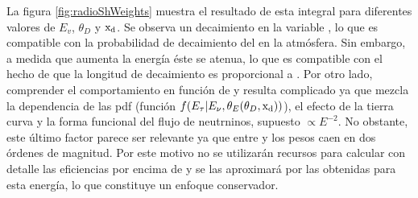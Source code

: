 	La figura \ref{fig:radioShWeights} muestra el resultado de esta integral para diferentes valores de $E_v$, $\theta_D$ y ${\rm x_d}$.
	Se observa un decaimiento en la variable \xd{}, lo que es compatible con la probabilidad de decaimiento del \tauon{} en la atm\'osfera. 
	Sin embargo, a medida que aumenta la energ\'ia \'este se atenua, lo que es compatible con el hecho de que la longitud de decaimiento es proporcional a \etau{}.
	Por otro lado, comprender el comportamiento en funci\'on de \td{} y \ev{} resulta complicado ya que mezcla la dependencia de las pdf (funci\'on $f(E_\tau|E_\nu,\theta_E(\theta_D,{\rm x_d}))$), el efecto de la tierra curva y la forma funcional del flujo de neutrninos, supuesto $\propto E^{-2}$.
	No obstante, este \'ultimo factor parece ser relevante ya que entre  y  los pesos caen en dos \'ordenes de magnitud.
	Por este motivo no se utilizar\'an recursos para calcular con detalle las eficiencias por encima de  y se las aproximar\'a por las obtenidas para esta energ\'ia, lo que constituye un enfoque conservador. 
